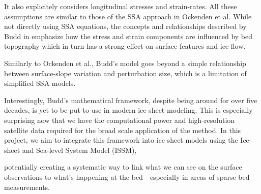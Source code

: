 It also explicitely considers longitudinal stresses and strain-rates. All these assumptions are similar to those of the SSA approach in Ockenden et al. While not directly using SSA equations, the concepts and relationships described by Budd in\cite{Budd_1970} emphasize how the stress and strain components are influenced by bed topography which in turn has a strong effect on surface features and ice flow.

Similarly to Ockenden et al., Budd's model goes beyond a simple relationship between surface-slope variation and perturbation size, which is a limitation of simplified SSA models.

Interestingly, Budd's mathematical framework, despite being around for over five decades, is yet to be put to use in modern ice sheet modeling. This is especially surprising now that we have the computational power and high-resolution satellite data required for the broad scale application of the method. In this project, we aim to integrate this framework into ice sheet models using the Ice-sheet and Sea-level System Model (ISSM), 


potentially creating a systematic way to link what we can see on the surface observations to what's happening at the bed - especially in areas of sparse bed measurements.